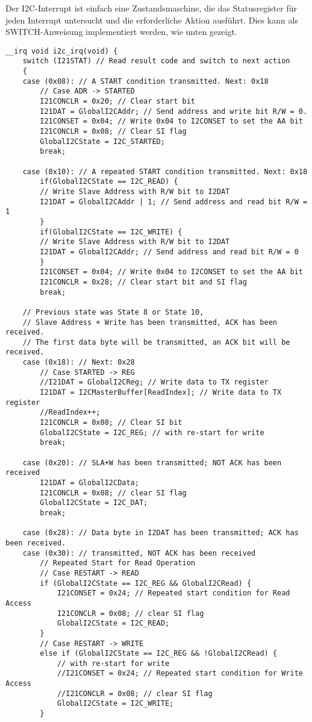 Der I2C-Interrupt ist einfach eine Zustandsmaschine, die das Statusregister für jeden Interrupt untersucht und die erforderliche Aktion ausführt. Dies kann als SWITCH-Anweisung implementiert werden, wie unten gezeigt.
\begin{lstlisting}
__irq void i2c_irq(void) {
	switch (I21STAT) // Read result code and switch to next action
	{
	case (0x08): // A START condition transmitted. Next: 0x18
		// Case ADR -> STARTED
		I21CONCLR = 0x20; // Clear start bit
		I21DAT = GlobalI2CAddr; // Send address and write bit R/W = 0.
		I21CONSET = 0x04; // Write 0x04 to I2CONSET to set the AA bit
		I21CONCLR = 0x08; // Clear SI flag
		GlobalI2CState = I2C_STARTED;
		break;
	
	case (0x10): // A repeated START condition transmitted. Next: 0x18
		if(GlobalI2CState == I2C_READ) {
		// Write Slave Address with R/W bit to I2DAT
		I21DAT = GlobalI2CAddr | 1; // Send address and read bit R/W = 1
		}
		if(GlobalI2CState == I2C_WRITE) {
		// Write Slave Address with R/W bit to I2DAT
		I21DAT = GlobalI2CAddr; // Send address and read bit R/W = 0
		}
		I21CONSET = 0x04; // Write 0x04 to I2CONSET to set the AA bit
		I21CONCLR = 0x28; // Clear start bit and SI flag
		break;
		
	// Previous state was State 8 or State 10, 
	// Slave Address + Write has been transmitted, ACK has been received.
	// The first data byte will be transmitted, an ACK bit will be received.
	case (0x18): // Next: 0x28
		// Case STARTED -> REG
		//I21DAT = GlobalI2CReg; // Write data to TX register
		I21DAT = I2CMasterBuffer[ReadIndex]; // Write data to TX register
		//ReadIndex++;
		I21CONCLR = 0x08; // Clear SI bit
		GlobalI2CState = I2C_REG; // with re-start for write
		break;
	
	case (0x20): // SLA+W has been transmitted; NOT ACK has been received
		I21DAT = GlobalI2CData;
		I21CONCLR = 0x08; // clear SI flag
		GlobalI2CState = I2C_DAT;
		break;
	
	case (0x28): // Data byte in I2DAT has been transmitted; ACK has been received.
	case (0x30): // transmitted, NOT ACK has been received
		// Repeated Start for Read Operation
		// Case RESTART -> READ
		if (GlobalI2CState == I2C_REG && GlobalI2CRead) {
			I21CONSET = 0x24; // Repeated start condition for Read Access
			I21CONCLR = 0x08; // clear SI flag
			GlobalI2CState = I2C_READ;
		}
		// Case RESTART -> WRITE
		else if (GlobalI2CState == I2C_REG && !GlobalI2CRead) {
			// with re-start for write
			//I21CONSET = 0x24; // Repeated start condition for Write Access
			//I21CONCLR = 0x08; // clear SI flag
			GlobalI2CState = I2C_WRITE;
		}
		

\end{lstlisting}
